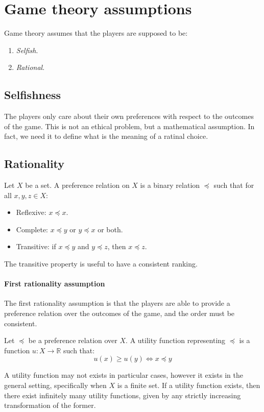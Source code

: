 \section{Game theory assumptions}

Game theory assumes that the players are supposed to be: 
\begin{enumerate}
    \item \textit{Selfish}. 
    \item \textit{Rational}. 
\end{enumerate}

\subsection{Selfishness}
The players only care about their own preferences with respect to the outcomes of the game.
This is not an ethical problem, but a mathematical assumption. 
In fact, we need it to define what is the meaning of a ratinal choice.
    



\subsection{Rationality}
\begin{definition}
    Let $X$ be a set. 
    A preference relation on $X$ is a binary relation $\preceq$ such that for all $x,y,z\in X$: 
    \begin{itemize}
        \item Reflexive: $x\preceq x$. 
        \item Complete: $x \preceq y$ or $y \preceq x$ or both. 
        \item Transitive: if $x \preceq y$ and $y \preceq z$, then $x \preceq z$. 
    \end{itemize}
\end{definition}
The transitive property is useful to have a consistent ranking. 

\paragraph*{First rationality assumption}
The first rationality assumption is that the players are able to provide a preference relation over the outcomes of the game, and the order must be consistent. 
\begin{definition}
    Let $\preceq$ be a preference relation over $X$.
    A utility function representing $\preceq$ is a function $u:X\rightarrow\mathbb{R}$ such that: 
    \[u(x)\geq u(y)\Leftrightarrow x \preceq y\]
\end{definition}
A utility function may not exists in particular cases, however it exists in the general setting, specifically when $X$ is a finite set. 
If a utility function exists, then there exist infinitely many utility functions, given by any strictly increasing transformation of the former. 

